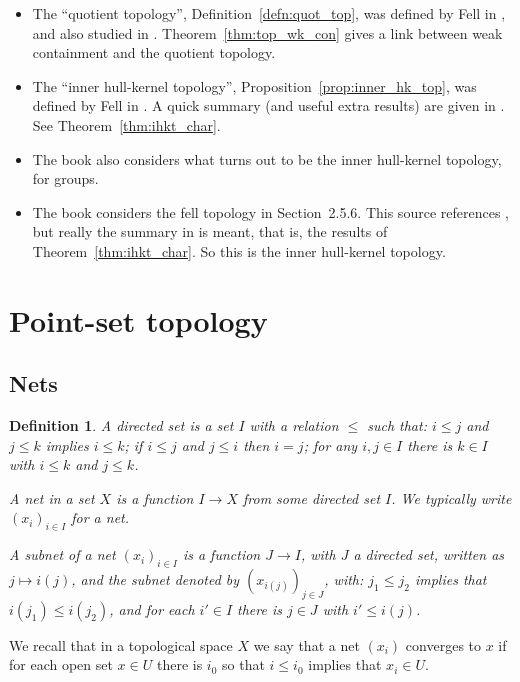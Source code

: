 \documentclass[a4paper,11pt]{article}
\newtheorem{definition}[lemma]{Definition}
\begin{document}
\begin{itemize}
\item The ``quotient topology'', Definition~\ref{defn:quot_top}, was defined by
Fell in \cite{fell1}, and also studied in \cite{fell2}.
Theorem~\ref{thm:top_wk_con} gives a link between weak containment and the
quotient topology.
\item The ``inner hull-kernel topology'', Proposition~\ref{prop:inner_hk_top},
was defined by Fell in \cite{fell1}.  A quick summary (and useful extra results)
are given in \cite{fell3}.  See Theorem~\ref{thm:ihkt_char}.
\item The book \cite[Appendix~F]{bhv} also considers what turns out to be the
inner hull-kernel topology, for groups.
\item The book \cite{cely} considers the fell topology in Section~2.5.6.
This source references \cite{fell2}, but really the summary in \cite{fell3} is
meant, that is, the results of Theorem~\ref{thm:ihkt_char}.  So this is the
inner hull-kernel topology.
\end{itemize}






\appendix
\section{Point-set topology}\label{app:one}

\subsection{Nets}

\begin{definition}
A \emph{directed set} is a set $I$ with a relation $\leq$ such that:
$i\leq j$ and $j\leq k$ implies $i\leq k$; if $i\leq j$ and $j\leq i$ then
$i=j$; for any $i,j\in I$ there is $k\in I$ with $i\leq k$ and $j\leq k$.

A \emph{net} in a set $X$ is a function $I\rightarrow X$ from some directed
set $I$.  We typically write $(x_i)_{i\in I}$ for a net.

A \emph{subnet} of a net $(x_i)_{i\in I}$ is a function $J\rightarrow I$,
with $J$ a directed set, written as $j\mapsto i(j)$, and the subnet denoted
by $(x_{i(j)})_{j\in J}$, with: $j_1\leq j_2$ implies that $i(j_1)\leq i(j_2)$,
and for each $i'\in I$ there is $j\in J$ with $i'\leq i(j)$.
\end{definition}

We recall that in a topological space $X$ we say that a net $(x_i)$ converges
to $x$ if for each open set $x\in U$ there is $i_0$ so that $i\leq i_0$ implies
that $x_i\in U$.
\end{document}
